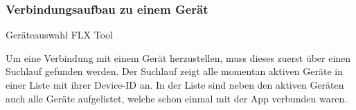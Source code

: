 \subsubsection{Verbindungsaufbau zu einem Gerät}
\label{subsubsec:Verbindungsaufbau zu einem Gerät}
\centerline{
}
\caption{Geräteauswahl FLX Tool}
Um eine Verbindung mit einem Gerät herzustellen, muss dieses zuerst über einen Suchlauf gefunden werden. Der Suchlauf zeigt alle momentan aktiven Geräte in einer Liste mit ihrer Device-ID an. In der Liste sind neben den aktiven Geräten auch alle Geräte aufgelistet, welche schon einmal mit der App verbunden waren.

